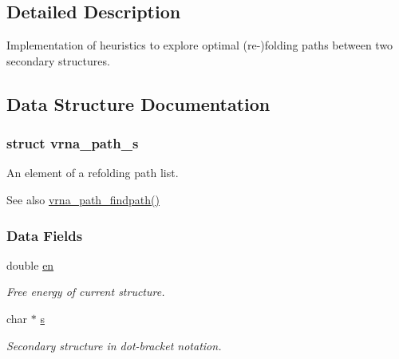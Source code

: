 \subsection{Detailed Description}
Implementation of heuristics to explore optimal (re-\/)folding paths between two secondary structures. 



\subsection{Data Structure Documentation}
\label{structvrna__path__s}
\hypertarget{group__direct__paths_structvrna__path__s}{}
\subsubsection{struct vrna\+\_\+path\+\_\+s}
An element of a refolding path list. 

\begin{DoxySeeAlso}{See also}
\hyperlink{group__direct__paths_ga5e1f97f58adc65016a8df88802dc16b5}{vrna\+\_\+path\+\_\+findpath()} 
\end{DoxySeeAlso}
\subsubsection*{Data Fields}
\begin{DoxyCompactItemize}
\item 
\hypertarget{group__direct__paths_ac25160bf31d28097358278f367e41227}{}double \hyperlink{group__direct__paths_ac25160bf31d28097358278f367e41227}{en}\label{group__direct__paths_ac25160bf31d28097358278f367e41227}

\begin{DoxyCompactList}\small\item\em Free energy of current structure. \end{DoxyCompactList}\item 
\hypertarget{group__direct__paths_a141b70a59cb81d10bc65bbb7a0f6db77}{}char $\ast$ \hyperlink{group__direct__paths_a141b70a59cb81d10bc65bbb7a0f6db77}{s}\label{group__direct__paths_a141b70a59cb81d10bc65bbb7a0f6db77}

\begin{DoxyCompactList}\small\item\em Secondary structure in dot-\/bracket notation. \end{DoxyCompactList}\end{DoxyCompactItemize}


